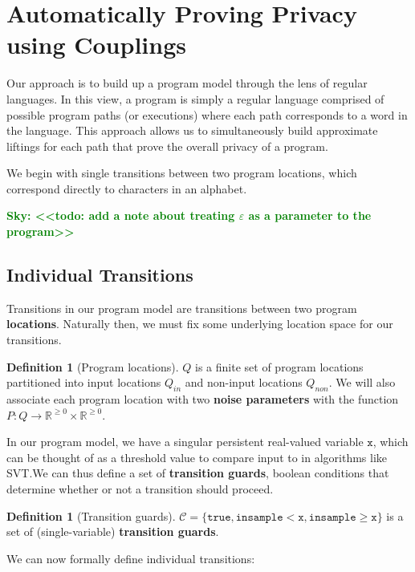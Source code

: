 \documentclass[12pt]{article}
\newcommand{\RR}{\mathbb{R}}
\newcommand{\gguard}[1][x]{\texttt{insample}\geq#1}
\newcommand{\lguard}[1][x]{\texttt{insample} < #1}
\newcommand{\todo}[2]{\textcolor{#1}{\textbf{#2}}}
\newcommand{\sky}[1]{\todo{green}{Sky: <<#1>>}}
\theoremstyle{definition}
\newtheorem{defn}[thm]{Definition}
\begin{document}
\section{Automatically Proving Privacy using Couplings}

Our approach is to build up a program model through the lens of regular languages. In this view, a program is simply a regular language comprised of possible program paths (or executions) where each path corresponds to a word in the language. This approach allows us to simultaneously build approximate liftings for each path that prove the overall privacy of a program.

We begin with single transitions between two program locations, which correspond directly to characters in an alphabet. 

\sky{todo: add a note about treating $\varepsilon$ as a parameter to the program}

\subsection{Individual Transitions}

Transitions in our program model are transitions between two program \textbf{locations}. Naturally then, we must fix some underlying location space for our transitions. 

\begin{defn}[Program locations]
    $Q$ is a finite set of program locations partitioned into input locations $Q_{in}$ and non-input locations $Q_{non}$. We will also associate each program location with two \textbf{noise parameters} with the function $P: Q\to \RR^{\geq 0}\times \RR^{\geq 0}$.
\end{defn}

In our program model, we have a singular persistent real-valued variable $\texttt{x}$, which can be thought of as a threshold value to compare input to in algorithms like SVT.\@ We can thus define a set of \textbf{transition guards}, boolean conditions that determine whether or not a transition should proceed. 

\begin{defn}[Transition guards]
    $\mathcal{C}=\{\texttt{true}, \lguard[\texttt{x}], \gguard[\texttt{x}]\}$ is a set of (single-variable) \textbf{transition guards}.
\end{defn}

We can now formally define individual transitions:
\end{document}
